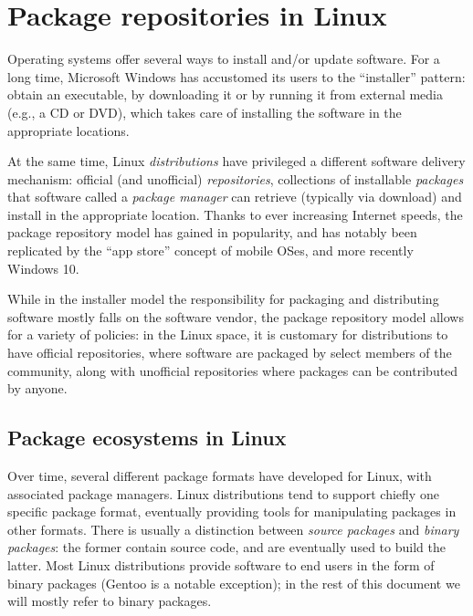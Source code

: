 \documentclass{deliverablereport}
\author{Luca De Feo \emph{et al.}}
\begin{document}
\maketitle
\githubissuedescription
\tableofcontents
\clearpage

\section{Package repositories in Linux}

Operating systems offer several ways to install and/or update
software. %
For a long time, Microsoft Windows has accustomed its users to the
``installer'' pattern: obtain an executable, by downloading it or by
running it from external media (e.g., a CD or DVD), which takes care
of installing the software in the appropriate locations.

At the same time, Linux \emph{distributions} have privileged a
different software delivery mechanism: official (and unofficial)
\emph{repositories}, collections of installable \emph{packages} that
software called a \emph{package manager} can retrieve (typically via
download) and install in the appropriate location. %
Thanks to ever increasing Internet speeds, the package repository
model has gained in popularity, and has notably been replicated by the
``app store'' concept of mobile OSes, and more recently Windows 10.

While in the installer model the responsibility for packaging and
distributing software mostly falls on the software vendor, the package
repository model allows for a variety of policies: in the Linux space,
it is customary for distributions to have official repositories, where
software are packaged by select members of the community, along with
unofficial repositories where packages can be contributed by anyone.

\subsection{Package ecosystems in Linux}

Over time, several different package formats have developed for Linux,
with associated package managers. %
Linux distributions tend to support chiefly one specific package
format, eventually providing tools for manipulating packages in other
formats. %
There is usually a distinction between \emph{source packages} and
\emph{binary packages}: the former contain source code, and are
eventually used to build the latter. %
Most Linux distributions provide software to end users in the form of
binary packages (Gentoo is a notable exception); in the rest of this
document we will mostly refer to binary packages.
\end{document}
